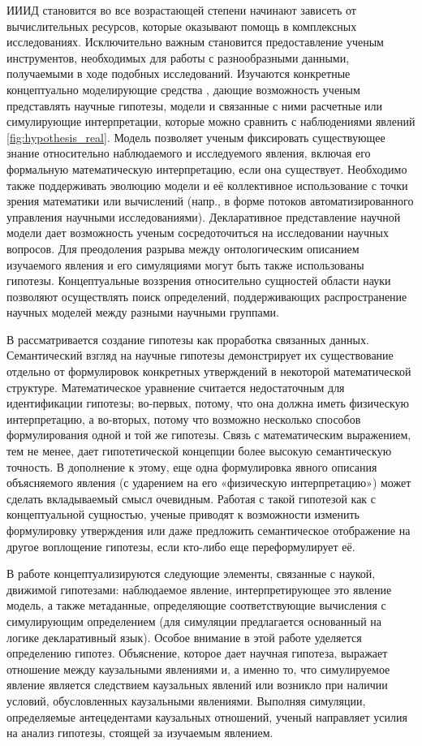 ИИИД становится во все возрастающей степени начинают зависеть от вычислительных ресурсов, которые оказывают помощь в 
комплексных исследованиях. Исключительно важным становится предоставление ученым инструментов, необходимых для работы 
с разнообразными данными, получаемыми в ходе подобных исследований. Изучаются конкретные концептуально моделирующие 
средства \cite{porto2013}, дающие возможность ученым представлять научные гипотезы, модели и связанные с ними расчетные 
или симулирующие интерпретации, которые можно сравнить с наблюдениями явлений \cref{fig:hypothesis_real}. Модель 
позволяет ученым фиксировать существующее знание относительно наблюдаемого и исследуемого явления, включая его 
формальную математическую интерпретацию, если она существует. Необходимо также поддерживать эволюцию модели и её 
коллективное использование с точки зрения математики или вычислений (напр., в форме потоков автоматизированного 
управления научными исследованиями). Декларативное представление научной модели дает возможность ученым сосредоточиться 
на исследовании научных вопросов. Для преодоления разрыва между онтологическим описанием изучаемого явления и его 
симуляциями могут быть также использованы гипотезы. Концептуальные воззрения относительно сущностей области науки 
позволяют осуществлять поиск определений, поддерживающих распространение научных моделей между разными 
научными группами. 

В \cite{Goncalves2013} рассматривается создание гипотезы как проработка связанных данных. Семантический взгляд на 
научные гипотезы демонстрирует их существование отдельно от формулировок конкретных утверждений в некоторой 
математической структуре. Математическое уравнение считается недостаточным для идентификации гипотезы; во-первых, 
потому, что она должна иметь физическую интерпретацию, а во-вторых, потому что возможно несколько способов 
формулирования одной и той же гипотезы. Связь с математическим выражением, тем не менее, дает гипотетической 
концепции более высокую семантическую точность. В дополнение к этому, еще одна формулировка явного описания 
объясняемого явления (с ударением на его «физическую интерпретацию») может сделать вкладываемый смысл очевидным. 
Работая с такой гипотезой как с концептуальной сущностью, ученые приводят к возможности изменить формулировку 
утверждения или даже предложить семантическое отображение на другое воплощение гипотезы, если кто-либо еще 
переформулирует её.

В работе \cite{porto2013} концептуализируются следующие элементы, связанные с наукой, движимой гипотезами: 
наблюдаемое явление, интерпретирующее это явление модель, а также метаданные, определяющие соответствующие вычисления 
с симулирующим определением (для симуляции предлагается основанный на логике декларативный язык). Особое внимание в 
этой работе уделяется определению гипотез. Объяснение, которое дает научная гипотеза, выражает отношение между 
каузальными явлениями и, а именно то, что симулируемое явление является следствием каузальных явлений или возникло 
при наличии условий, обусловленных каузальными явлениями. Выполняя симуляции, определяемые антецедентами каузальных 
отношений, ученый направляет усилия на анализ гипотезы, стоящей за изучаемым явлением.

